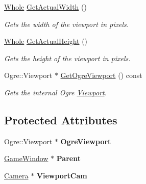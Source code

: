 \begin{DoxyCompactItemize}
\hyperlink{namespacephys_a460f6bc24c8dd347b05e0366ae34f34a}{Whole} \hyperlink{classphys_1_1Viewport_a301262e5da6926296241f0e2cc2de7d2}{GetActualWidth} ()
\begin{DoxyCompactList}\small\item\em Gets the width of the viewport in pixels. \item\end{DoxyCompactList}\item 
\hyperlink{namespacephys_a460f6bc24c8dd347b05e0366ae34f34a}{Whole} \hyperlink{classphys_1_1Viewport_a1eee22594548a38910dee8e838e6449d}{GetActualHeight} ()
\begin{DoxyCompactList}\small\item\em Gets the height of the viewport in pixels. \item\end{DoxyCompactList}\item 
Ogre::Viewport $\ast$ \hyperlink{classphys_1_1Viewport_a005b39a37464c4f4a365c2bdb08ffb04}{GetOgreViewport} () const 
\begin{DoxyCompactList}\small\item\em Gets the internal Ogre \hyperlink{classphys_1_1Viewport}{Viewport}. \item\end{DoxyCompactList}\end{DoxyCompactItemize}
\subsection*{Protected Attributes}
\begin{DoxyCompactItemize}
\item 
\hypertarget{classphys_1_1Viewport_a5251d485654d73414b9efdbb73015c83}{
Ogre::Viewport $\ast$ {\bfseries OgreViewport}}
\label{d5/d62/classphys_1_1Viewport_a5251d485654d73414b9efdbb73015c83}

\item 
\hypertarget{classphys_1_1Viewport_a833d36e97945498b2a4766c47c756e2f}{
\hyperlink{classphys_1_1GameWindow}{GameWindow} $\ast$ {\bfseries Parent}}
\label{d5/d62/classphys_1_1Viewport_a833d36e97945498b2a4766c47c756e2f}

\item 
\hypertarget{classphys_1_1Viewport_a3eb772321faeee0f76a80329ddc61885}{
\hyperlink{classphys_1_1Camera}{Camera} $\ast$ {\bfseries ViewportCam}}
\label{d5/d62/classphys_1_1Viewport_a3eb772321faeee0f76a80329ddc61885}

\end{DoxyCompactItemize}


